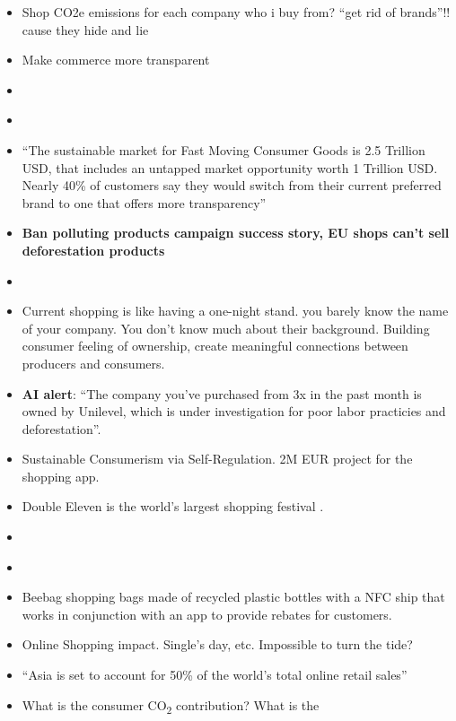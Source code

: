 \documentclass[
  letterpaper,
  DIV=11,
  numbers=noendperiod]{scrartcl}
\begin{document}
\begin{itemize}
\item
  Shop CO2e emissions for each company who i buy from? ``get rid of
  brands''!! cause they hide and lie
\item
  Make commerce more transparent
\item
  \citet{DecreasingCarbonFootprint2019}
\item
  \citet{sallyparkerWantLowerFood2022}
\item
  ``The sustainable market for Fast Moving Consumer Goods is 2.5
  Trillion USD, that includes an untapped market opportunity worth 1
  Trillion USD. Nearly 40\% of customers say they would switch from
  their current preferred brand to one that offers more transparency''
\item
  \citet{EUBanForestkilling} \textbf{Ban polluting products campaign
  success story, EU shops can't sell deforestation products}
\item
  \citet{BurningBridgesAllbridges}
\item
  Current shopping is like having a one-night stand. you barely know the
  name of your company. You don't know much about their background.
  Building consumer feeling of ownership, create meaningful connections
  between producers and consumers.
\item
  \textbf{AI alert}: ``The company you've purchased from 3x in the past
  month is owned by Unilevel, which is under investigation for poor
  labor practicies and deforestation''.
\item
  Sustainable Consumerism via Self-Regulation. 2M EUR project for the
  shopping app.
\item
  Double Eleven is the world's largest shopping festival
  \citep{double11festival2023}.
\item
  \citet{klinglmayrSustainableConsumerismSelfRegulation2016}
\item
  \citet{emilywaterfieldAppsThatCan2019}
\item
  Beebag shopping bags made of recycled plastic bottles with a NFC ship
  that works in conjunction with an app to provide rebates for
  customers. \citet{thegreenfactorEP62Gamification2022}
\item
  \citet{iginiEnvironmentalImpactOnline2022} Online Shopping impact.
  Single's day, etc. Impossible to turn the tide?
\item
  ``Asia is set to account for 50\% of the world's total online retail
  sales''
\item
  What is the consumer CO\textsubscript{2} contribution? What is the

\end{itemize}
\end{document}
